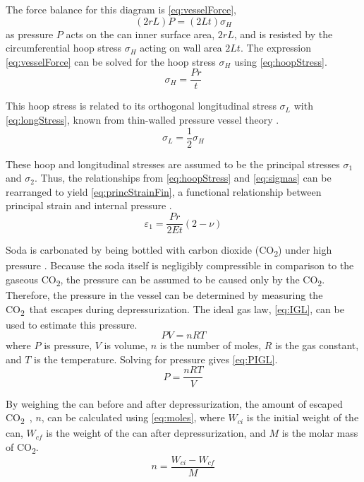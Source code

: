 \documentclass[10pt,journal,letterpaper]{IEEEtran}
\newcommand{\co}{CO\textsubscript{2}}
\begin{document}
The force balance for this diagram is \eqref{eq:vesselForce},
\begin{equation}
\label{eq:vesselForce}
(2rL)P=(2Lt)\sigma_H
\end{equation}
as pressure $P$ acts on the can inner surface area, $2rL$, and is resisted by the circumferential hoop stress $\sigma_H$ acting on wall area $2Lt$.
The expression \eqref{eq:vesselForce} can be solved for the hoop stress $\sigma_H$ using \eqref{eq:hoopStress}.
\begin{equation}
\label{eq:hoopStress}
\sigma_H=\frac{Pr}{t}
\end{equation}

This hoop stress is related to its orthogonal longitudinal stress $\sigma_L$ with \eqref{eq:longStress}, known from thin-walled pressure vessel theory \cite{b1}.
\begin{equation}
\label{eq:longStress}
\sigma_L=\frac{1}{2}\sigma_H
\end{equation}

These hoop and longitudinal stresses are assumed to be the principal stresses $\sigma_1$ and $\sigma_2$.
Thus, the relationships from \eqref{eq:hoopStress} and \eqref{eq:sigmas} can be rearranged to yield \eqref{eq:princStrainFin}, a functional relationship between principal strain and internal pressure \cite{b1}.
\begin{equation}
\label{eq:princStrainFin}
\varepsilon_1=\frac{Pr}{2Et}(2-\nu)
\end{equation}

Soda is carbonated by being bottled with carbon dioxide (\co) under high pressure \cite{b9}.
Because the soda itself is negligibly compressible in comparison to the gaseous \co , the pressure can be assumed to be caused only by the \co .
Therefore, the pressure in the vessel can be determined by measuring the \co\ that escapes during depressurization.
The ideal gas law, \eqref{eq:IGL}, can be used to estimate this pressure.
\begin{equation}
\label{eq:IGL}
PV=nRT
\end{equation}
where $P$ is pressure, $V$ is volume, $n$ is the number of moles, $R$ is the gas constant, and $T$ is the temperature.
Solving for pressure gives \eqref{eq:PIGL}.
\begin{equation}
\label{eq:PIGL}
P = \frac{nRT}{V}
\end{equation}

By weighing the can before and after depressurization, the amount of escaped \co\ , $n$, can be calculated using \eqref{eq:moles}, where $W_{ci}$ is the initial weight of the can, $W_{cf}$ is the weight of the can after depressurization, and $M$ is the molar mass of \co.
\begin{equation}
\label{eq:moles}
n=\frac{W_{ci}-W_{cf}}{M}
\end{equation}
\end{document}
